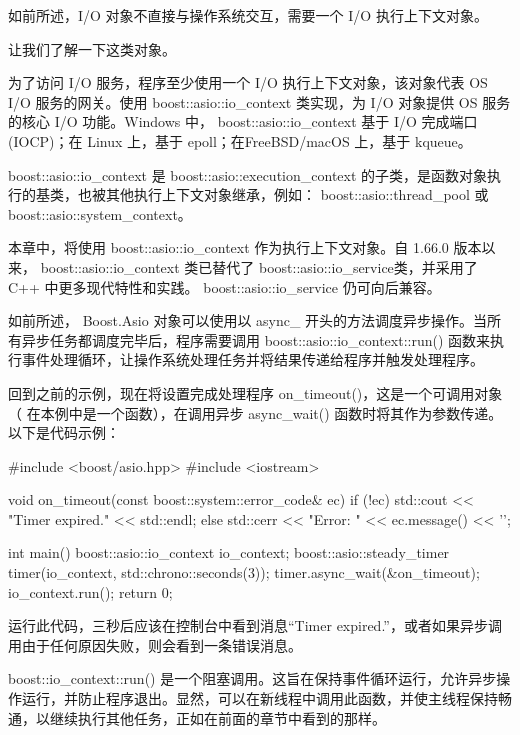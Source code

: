 如前所述，I/O 对象不直接与操作系统交互，需要一个 I/O 执行上下文对象。

让我们了解一下这类对象。


为了访问 I/O 服务，程序至少使用一个 I/O 执行上下文对象，该对象代表 OS I/O 服务的网关。使用 boost::asio::io\_context 类实现，为 I/O 对象提供 OS 服务的核心 I/O 功能。Windows 中， boost::asio::io\_context 基于 I/O 完成端口 (IOCP)；在 Linux 上，基于 epoll；在FreeBSD/macOS 上，基于 kqueue。


boost::asio::io\_context 是 boost::asio::execution\_context 的子类，是函数对象执行的基类，也被其他执行上下文对象继承，例如： boost::asio::thread\_pool 或 boost::asio::system\_context。

本章中，将使用 boost::asio::io\_context 作为执行上下文对象。自 1.66.0 版本以来， boost::asio::io\_context 类已替代了 boost::asio::io\_service类，并采用了 C++ 中更多现代特性和实践。 boost::asio::io\_service 仍可向后兼容。

如前所述， Boost.Asio 对象可以使用以 async\_ 开头的方法调度异步操作。当所有异步任务都调度完毕后，程序需要调用 boost::asio::io\_context::run() 函数来执行事件处理循环，让操作系统处理任务并将结果传递给程序并触发处理程序。

回到之前的示例，现在将设置完成处理程序 on\_timeout()，这是一个可调用对象（ 在本例中是一个函数），在调用异步 async\_wait() 函数时将其作为参数传递。以下是代码示例：

\begin{cpp}
#include <boost/asio.hpp>
#include <iostream>

void on_timeout(const boost::system::error_code& ec) {
    if (!ec) {
        std::cout << "Timer expired.\n" << std::endl;
    } else {
        std::cerr << "Error: " << ec.message() << '\n';
    }
}

int main() {
    boost::asio::io_context io_context;
    boost::asio::steady_timer timer(io_context,
                                std::chrono::seconds(3));
    timer.async_wait(&on_timeout);
    io_context.run();
    return 0;
}
\end{cpp}

运行此代码，三秒后应该在控制台中看到消息“Timer expired.”，或者如果异步调用由于任何原因失败，则会看到一条错误消息。

boost::io\_context::run() 是一个阻塞调用。这旨在保持事件循环运行，允许异步操作运行，并防止程序退出。显然，可以在新线程中调用此函数，并使主线程保持畅通，以继续执行其他任务，正如在前面的章节中看到的那样。

